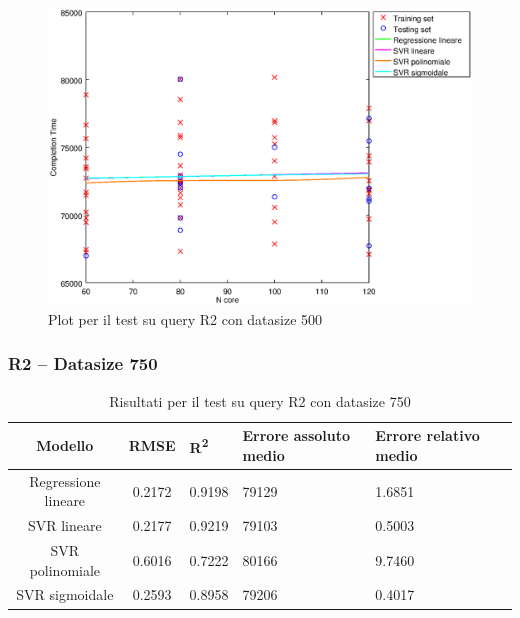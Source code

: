 \documentclass[a4paper,11pt]{article}
\begin{document}
\begin {figure}[hbtp]
\centering
\includegraphics[width=\textwidth]{output/R2_500/plot_R2_500.eps}
\caption {Plot per il test su query R2 con datasize 500}
\end {figure}
\newpage
\subsubsection{R2 -- Datasize 750}
\begin{table}[bhpt]
	\centering
	\begin{adjustbox}{center}
		\begin{tabular}{c | c M{1cm} M{2.5cm} M{2.5cm} M{1.8cm}}
			Modello & RMSE & R\textsuperscript{2} & Errore assoluto medio & Errore relativo medio \tabularnewline
			\hline
			Regressione lineare & 0.2172 & 0.9198 &  79129 & 1.6851 \\
			SVR lineare & 0.2177 & 0.9219 &  79103 & 0.5003 \\
			SVR polinomiale & 0.6016 & 0.7222 &  80166 & 9.7460 \\
			SVR sigmoidale & 0.2593 & 0.8958 &  79206 & 0.4017 \\
		\end{tabular}
	\end{adjustbox}
	\\
	\caption{Risultati per il test su query R2 con datasize 750}
	\label{table_R2_750}
\end{table}
\end{document}

